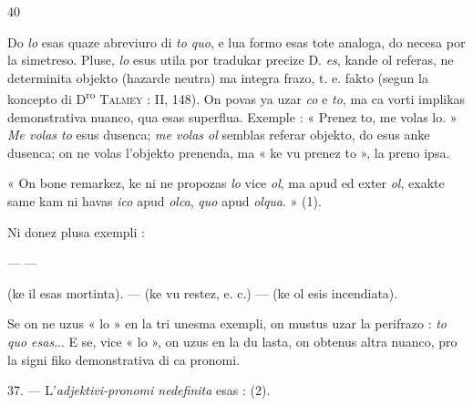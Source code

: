 \begin{VUpage}[44]{40}

\VUcontinue Do \textit{lo} esas quaze abreviuro di \textit{to quo}, e lua formo esas tote\nl
analoga, do necesa por la simetreso. Pluse, \textit{lo} esus utila\nl
por tradukar precize D. \textit{es}, kande ol referas, ne determinita\nl
objekto (hazarde neutra) ma integra frazo, t. e. fakto\nl
(segun la koncepto di D\textsuperscript{ro} \textsc{Talmey} : II, 148). On povas\nl
ya uzar \textit{co} e \textit{to}, ma ca vorti implikas demonstrativa\nl
nuanco, qua esas superflua. Exemple : « Prenez to, me\nl
volas lo. » \textit{Me volas to} esus dusenca; \textit{me volas ol} semblas\nl
referar objekto, do esus anke dusenca; on ne volas l'objekto\nl
prenenda, ma « ke vu prenez to », la preno ipsa.

« On bone remarkez, ke ni ne propozas \textit{lo} vice \textit{ol}, ma\nl
apud ed exter \textit{ol}, exakte same kam ni havas \textit{ico} apud \textit{olca},\nl
\textit{quo} apud \textit{olqua}. » (1).

Ni donez plusa exempli :

 --- \nl
{} --- \nl
{}

 (ke il\nl
esas mortinta). ---  (ke vu\nl
restez, e. c.) --- \nl
{} (ke ol esis incendiata).

Se on ne uzus « lo » en la tri unesma exempli, on mustus\nl
uzar la perifrazo : \textit{to quo esas}... E se, vice « lo », on uzus\nl
{} en la du lasta, on obtenus altra nuanco, pro la signi\cc
fiko demonstrativa di ca pronomi.

\VUsaut{8.11mm}
\VUsaut{5.10mm}

37. --- L'\textit{adjektivi-pronomi nedefinita} esas : \nl
{}\nl
{} (2).
\end{VUpage}


